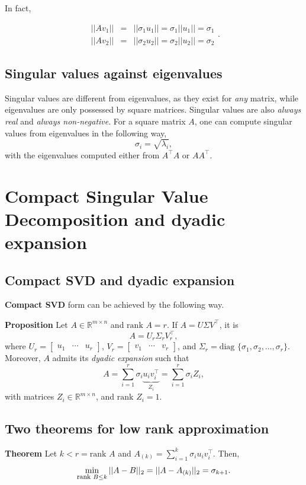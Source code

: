 \documentclass[10pt]{report}
\begin{document}
In fact,

\[\begin{array}{rcl} ||Av_1|| & = & ||\sigma_1 u_1|| = \sigma_1 ||u_1|| = \sigma_1\\ ||Av_2|| & = & ||\sigma_2 u_2|| = \sigma_2 ||u_2|| = \sigma_2\end{array}.\]
\subsection{Singular values against eigenvalues}
\label{sec:org7e52d54}

Singular values are different from eigenvalues, as they exist for \emph{any} matrix, while eigenvalues are only possessed by square matrices. Singular values are also \emph{always real} and \emph{always non\--negative}. For a square matrix \(A\), one can compute singular values from eigenvalues in the following way, $$\sigma_i = \sqrt{\lambda_i},$$ with the eigenvalues computed either from \(A^\top A\) or \(AA^\top\).
\section{Compact Singular Value Decomposition and dyadic expansion}
\label{sec:org6fabf77}
\subsection{Compact SVD and dyadic expansion}
\label{sec:org0256baa}
\textbf{Compact SVD} form can be achieved by the following way.

\textbf{Proposition} Let \(A \in \mathbb{R}^{m \times n}\) and \(\mbox{rank }A =r\). If \(A = U\Sigma V^\top\), it is $$A = U_r\Sigma_r V^\top_r,$$ where \(U_r = \begin{bmatrix}u_1 & \cdots  & u_r\end{bmatrix}\), \(V_r = \begin{bmatrix}v_1 & \cdots  & v_r\end{bmatrix}\), and \(\Sigma_r = \mbox{diag }\{\sigma_1, \sigma_2, \dots, \sigma_r\}.\) Moreover, \(A\) admits its \emph{dyadic expansion} such that $$A = \sum_{i=1}^r \sigma_i \underbrace{u_i v^\top_i}_{Z_i} = \sum_{i=1}^r \sigma_i Z_i,$$ with matrices \(Z_i \in \mathbb{R}^{m \times n}\), and \(\mbox{rank }Z_i = 1\).
\subsection{Two theorems for low rank approximation}
\label{sec:org4d92b96}
\textbf{Theorem} Let \(k < r = \mbox{rank }A\) and \(A_{(k)} = \sum_{i=1}^k \sigma_i u_i v^\top_i\). Then, $$\min_{\mbox{\footnotesize rank }B \leq k} ||A-B||_2 = ||A - A_{(k)}||_2 = \sigma_{k+1}.$$
\end{document}
